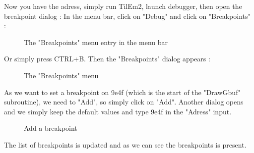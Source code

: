 \documentclass[10pt]{report}
\begin{document}
Now you have the adress, simply run TilEm2, launch debugger, then open the breakpoint dialog :\newline
In the menu bar, click on "Debug" and click on "Breakpoints" :\newline

\begin{figure}[H]
\centering
{}
\caption{The "Breakpoints" menu entry in the menu bar}
\end{figure}

Or simply press CTRL+B.\newline
Then the "Breakpoints" dialog appears :\newline

\begin{figure}[H]
\centering
{}
\caption{The "Breakpoints" menu}
\end{figure}

As we want to set a breakpoint on 9e4f (which is the start of the "DrawGbuf" subroutine), we need to "Add", so simply click on "Add".\newline
Another dialog opens and we simply keep the default values and type 9e4f in the "Adress" input.\newline 
\begin{figure}[H]
\centering
{}
\caption{Add a breakpoint}
\end{figure}
The list of breakpoints is updated and as we can see the breakpoints is present.\newline
\end{document}
